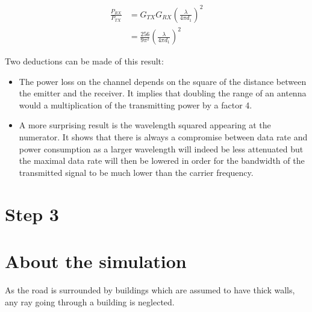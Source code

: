\documentclass[10pt,a4paper]{ULBreport}
\begin{document}
\begin{align}
    \frac{P_{RX}}{P_{TX}} &= G_{TX} G_{RX} \left(\frac{\lambda}{4\pi d_1}\right)^2\\
    \label{eq:power_friis_simplified}
    &= \frac{256}{9\pi^2} \left(\frac{\lambda}{4\pi d_1}\right)^2
\end{align}

Two deductions can be made of this result: 
\begin{itemize}
    \item The power loss on the channel depends on the square of the distance between the emitter and the receiver. It implies that doubling the range of an antenna would a multiplication of the transmitting power by a factor 4.
    \item A more surprising result is the wavelength squared appearing at the numerator. It shows that there is always a compromise between data rate and power consumption as a larger wavelength will indeed be less attenuated but the maximal data rate will then be lowered in order for the bandwidth of the transmitted signal to be much lower than the carrier frequency.
\end{itemize}

\section{Step 3}


\section{About the simulation}

As the road is surrounded by buildings which are assumed to have thick walls, any ray going through a building is neglected.



\end{document}
